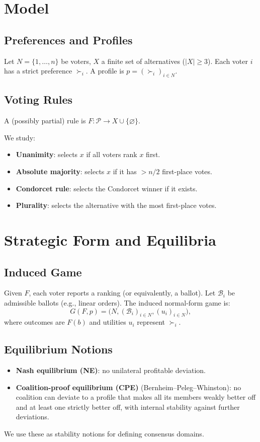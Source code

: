 \documentclass{article}
\begin{document}
\section{Model}
\subsection{Preferences and Profiles}
Let $N = \{1,\dots,n\}$ be voters, $X$ a finite set of alternatives ($|X|\ge 3$). Each voter $i$ has a strict preference $\succ_i$. A profile is $p = (\succ_i)_{i\in N}$.

\subsection{Voting Rules}
A (possibly partial) rule is $F: \mathcal P \to X \cup \{\varnothing\}$.

We study:
\begin{itemize}
    \item \textbf{Unanimity}: selects $x$ if all voters rank $x$ first.
    \item \textbf{Absolute majority}: selects $x$ if it has $> n/2$ first-place votes.
    \item \textbf{Condorcet rule}: selects the Condorcet winner if it exists.
    \item \textbf{Plurality}: selects the alternative with the most first-place votes.
\end{itemize}

\section{Strategic Form and Equilibria}
\subsection{Induced Game}
Given $F$, each voter reports a ranking (or equivalently, a ballot). Let $\mathcal B_i$ be admissible ballots (e.g., linear orders). The induced normal-form game is:
\[
G(F,p) = \big(N, (\mathcal B_i)_{i\in N}, (u_i)_{i\in N}\big),
\]
where outcomes are $F(b)$ and utilities $u_i$ represent $\succ_i$.

\subsection{Equilibrium Notions}
\begin{itemize}
    \item \textbf{Nash equilibrium (NE)}: no unilateral profitable deviation.
    \item \textbf{Coalition-proof equilibrium (CPE)} (Bernheim–Peleg–Whinston): no coalition can deviate to a profile that makes all its members weakly better off and at least one strictly better off, with internal stability against further deviations.
\end{itemize}
We use these as stability notions for defining consensus domains.
\end{document}

